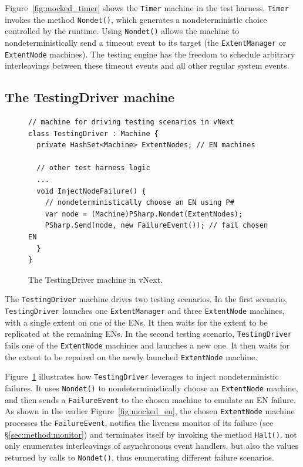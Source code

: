 Figure~\ref{fig:mocked_timer} shows the \texttt{Timer} machine in the test harness. \texttt{Timer} invokes the \psharp method \texttt{Nondet()}, which generates a nondeterministic choice controlled by the \psharp runtime. Using \texttt{Nondet()} allows the machine to nondeterministically send a timeout event to its target (the \texttt{ExtentManager} or \texttt{ExtentNode} machines). The \psharp testing engine has the freedom to schedule arbitrary interleavings between these timeout events and all other regular system events.

\subsection{The TestingDriver machine}
\label{sec:method:driver}

\begin{figure}[t]
\begin{lstlisting}
// machine for driving testing scenarios in vNext
class TestingDriver : Machine {
  private HashSet<Machine> ExtentNodes; // EN machines
  
  // other test harness logic
  ...
  void InjectNodeFailure() {
    // nondeterministically choose an EN using P#
    var node = (Machine)PSharp.Nondet(ExtentNodes);    
    PSharp.Send(node, new FailureEvent()); // fail chosen EN
  }
}
\end{lstlisting}
\vspace{-4mm}
\caption{The TestingDriver machine in vNext.}
\label{fig:testing_driver}
\vspace{-2mm}
\end{figure}

The \texttt{TestingDriver} machine drives two testing scenarios. In the first scenario, \texttt{TestingDriver} launches one \texttt{ExtentManager} and three \texttt{ExtentNode} machines, with a single extent on one of the ENs. It then waits for the extent to be replicated at the remaining ENs. In the second testing scenario, \texttt{TestingDriver} fails one of the \texttt{ExtentNode} machines and launches a new one. It then waits for the extent to be repaired on the newly launched \texttt{ExtentNode} machine.

Figure~\ref{fig:testing_driver} illustrates how \texttt{TestingDriver} leverages \psharp to inject nondeterministic failures. It uses \texttt{Nondet()} to nondeterministically choose an \texttt{ExtentNode} machine, and then sends a \texttt{FailureEvent} to the chosen machine to emulate an EN failure. As shown in the earlier Figure~\ref{fig:mocked_en}, the chosen \texttt{ExtentNode} machine processes the \texttt{FailureEvent}, notifies the liveness monitor of its failure (see \S\ref{sec:method:monitor}) and terminates itself by invoking the \psharp method \texttt{Halt()}. \psharp not only enumerates interleavings of asynchronous event handlers, but also the values returned by calls to \texttt{Nondet()}, thus enumerating different failure scenarios.

